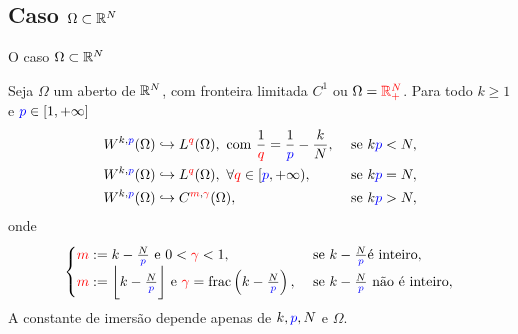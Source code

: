 \subsection*{Caso \texorpdfstring{\(\Omega\subset\mathbb{R}^N\)}{Ω⊂ℝᵈ}}
\begin{frame}{O caso \(\Omega\subset\mathbb{R}^N\)}
\begin{teo}
Seja \(\Omega\) um aberto de \(\mathbb{R}^N\), {\color{red} com fronteira limitada \(C^1\)} ou \(\Omega={\color{red} \mathbb{R}^N_{+} }\). Para todo \(k\geq 1\) e \({\color{blue} p }\in [1,+\infty]\)
\begin{align*}
& W^{k,{\color{blue} p }}(\Omega)\hookrightarrow L^{\color{red} q }(\Omega), \text{ com } \frac{1}{{\color{red} q }}=\frac{1}{{\color{blue} p }}-\frac{k}{N},  &
 \text{ se } k{\color{blue} p }<N,\\
& W^{k,{\color{blue} p }}(\Omega)\hookrightarrow L^{\color{red} q }(\Omega),\ \forall {\color{red} q }\in [{\color{blue} p },+\infty),& \text{ se }  k{\color{blue} p }=N,\\
& W^{k,{\color{blue} p }}(\Omega)\hookrightarrow C^{{\color{red} m },{\color{red} \gamma }}(\Omega),
& \text{ se }  k{\color{blue} p }>N,
\end{align*}
onde 
\[
\begin{cases}
{\color{red}m}:= k-\frac{N}{{\color{blue} p}} 
\text{ e } 0< {\color{red} \gamma }<1,
& \text{ se } k-\frac{N}{{\color{blue} p }} \text{é inteiro},\\
{\color{red}m}:=\bigg\lfloor k-\frac{N}{{\color{blue} p }}\bigg\rfloor 
\text{ e } {\color{red} \gamma }=  \operatorname{frac}\left(k-\frac{N}{{\color{blue} p}}\right), 
& \text{ se } k-\frac{N}{{\color{blue} p }} \text{ não é inteiro},
\end{cases}
\]
A constante de imersão depende apenas de \(k, {\color{blue} p }, N\) e \(\Omega\).
\end{teo}
\end{frame}


